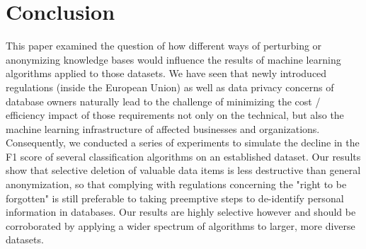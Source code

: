 \documentclass{llncs}
\begin{document}
\section{Conclusion}
\label{sect:conclusion}

This paper examined the question of how different ways of perturbing or anonymizing knowledge bases would influence the results of machine learning algorithms applied to those datasets. We have seen that newly introduced regulations (inside the European Union) as well as data privacy concerns of database owners naturally lead to the challenge of minimizing the cost / efficiency impact of those requirements not only on the technical, but also the machine learning infrastructure of affected businesses and organizations. Consequently, we conducted a series of experiments to simulate the decline in the F1 score of several classification algorithms on an established dataset. Our results show that selective deletion of valuable data items is less destructive than general anonymization, so that complying with regulations concerning the "right to be forgotten" is still preferable to taking preemptive steps to de-identify personal information in databases. Our results are highly selective however and should be corroborated by applying a wider spectrum of algorithms to larger, more diverse datasets.




\end{document}
